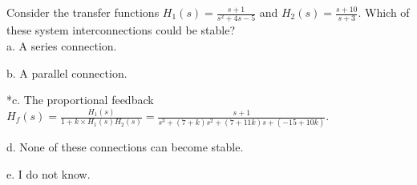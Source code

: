 
Consider the transfer functions \(H_{1}\left( s \right) = \frac{s + 1}{s^{2} + 4s - 5}\) and \(H_{2}\left( s \right) = \frac{s + 10}{s + 3}\). Which of these system interconnections could be stable? \\

a. A series connection.

b. A parallel connection.

*c. The proportional feedback \(H_{f}\left( s \right) = \frac{H_{1}\left( s \right)}{1 + k \times H_{1}\left( s \right)H_{2}\left( s \right)} = \frac{s + 1}{s^{3} + \left( 7 + k \right)s^{2} + \left( 7 + 11k \right)s + \left( - 15 + 10k \right)}\).

d. None of these connections can become stable.

e. I do not know. \\
